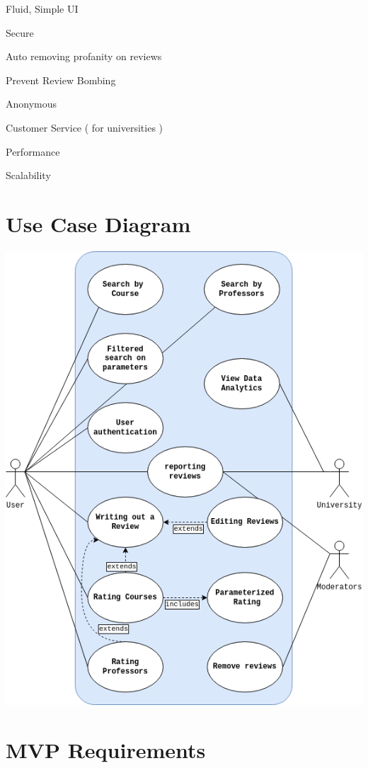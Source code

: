 \documentclass{article}
\begin{document}
	\quad Fluid, Simple UI

	\quad Secure

	\quad Auto removing profanity on reviews

	\quad Prevent Review Bombing

	\quad Anonymous

	\quad Customer Service ( for universities )

	\quad Performance

	\quad Scalability

\section{Use Case Diagram} 

\begin{center}
	\includegraphics[scale=0.5]{../requirements_specification/USECASE.drawio.png}	
\end{center}

\section{MVP Requirements}
\end{document}
